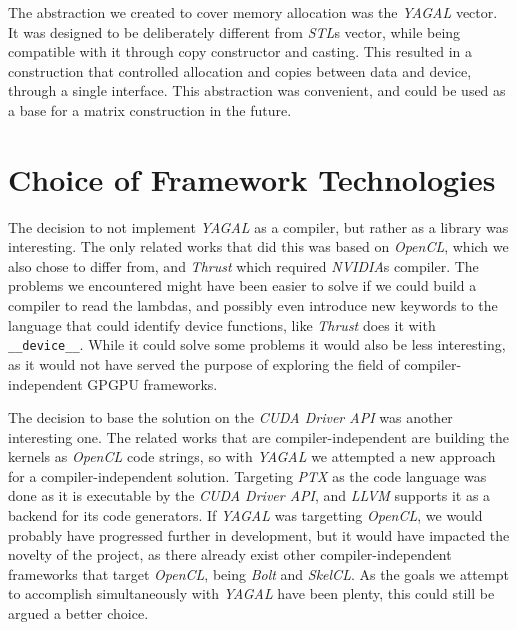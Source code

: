 The abstraction we created to cover memory allocation was the \textit{YAGAL} vector. It was designed to be deliberately different from \textit{STL}s vector, while being compatible with it through copy constructor and casting. This resulted in a construction that controlled allocation and copies between data and device, through a single interface. This abstraction was convenient, and could be used as a base for a matrix construction in the future.

\section{Choice of Framework Technologies}
The decision to not implement \textit{YAGAL} as a compiler, but rather as a library was interesting. The only related works that did this was based on \textit{OpenCL}, which we also chose to differ from, and \textit{Thrust} which required \textit{NVIDIA}s compiler. The problems we encountered might have been easier to solve if we could build a compiler to read the lambdas, and possibly even introduce new keywords to the language that could identify device functions, like \textit{Thrust} does it with \texttt{\_\_device\_\_}. While it could solve some problems it would also be less interesting, as it would not have served the purpose of exploring the field of compiler-independent GPGPU frameworks.  

The decision to base the solution on the \textit{CUDA Driver API} was another interesting one. The related works that are compiler-independent are building the kernels as \textit{OpenCL} code strings, so with \textit{YAGAL} we attempted a new approach for a compiler-independent solution. Targeting \textit{PTX} as the code language was done as it is executable by the \textit{CUDA Driver API}, and \textit{LLVM} supports it as a backend for its code generators. If \textit{YAGAL} was targetting \textit{OpenCL}, we would probably have progressed further in development, but it would have impacted the novelty of the project, as there already exist other compiler-independent frameworks that target \textit{OpenCL}, being \textit{Bolt} and \textit{SkelCL}. As the goals we attempt to accomplish simultaneously with \textit{YAGAL} have been plenty, this could still be argued a better choice.

